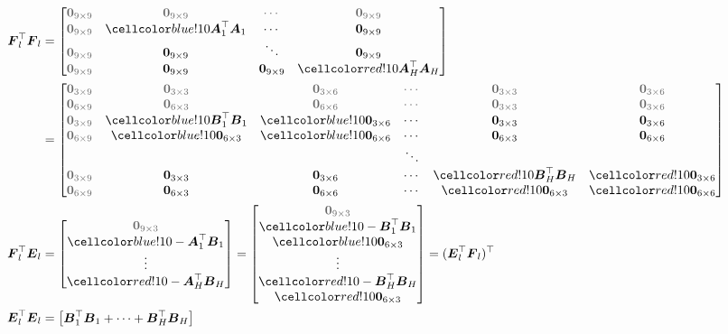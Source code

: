 \begin{align*}
\F_l^\top\F_l &=
\begin{bmatrix}
\g\zero_{9\times9}&\g\zero_{9\times9}&\g\cdots&\g\zero_{9\times9}\\
\g\zero_{9\times9}&\cob\A_1^\top\A_1&\cdots&\zero_{9\times9}\\
\g\zero_{9\times9}&\zero_{9\times9}&\ddots&\zero_{9\times9}\\
\g\zero_{9\times9}&\zero_{9\times9}&\zero_{9\times9}&\cor\A_H^\top\A_H\\
\end{bmatrix}\\
&=
\begin{bmatrix}
\g\zero_{3\times9}&\g\zero_{3\times3}&\g\zero_{3\times6}&\g\cdots&\g\zero_{3\times3}&\g\zero_{3\times6}\\
\g\zero_{6\times9}&\g\zero_{6\times3}&\g\zero_{6\times6}&\g\cdots&\g\zero_{3\times3}&\g\zero_{3\times6}\\
\g\zero_{3\times9}& \cob\B_1^\top\B_1   &\cob\zero_{3\times6} &\cdots   &\zero_{3\times3}&\zero_{3\times6}\\
\g\zero_{6\times9}& \cob\zero_{6\times3}&\cob\zero_{6\times6} &\cdots&\zero_{6\times3}&\zero_{6\times6}\\
&&&\ddots&&\\
\g\zero_{3\times9}&\zero_{3\times3}&\zero_{3\times6}&\cdots&\cor\B_H^\top\B_H   &\cor\zero_{3\times6}\\
\g\zero_{6\times9}&\zero_{6\times3}&\zero_{6\times6}&\cdots&\cor\zero_{6\times3}&\cor\zero_{6\times6}
\end{bmatrix}\\
\F_l^\top\E_l &= \begin{bmatrix} \g\zero_{9\times3}\\ \cob-\A_1^\top\B_1\\ \vdots\\ \cor-\A_H^\top\B_H\\ \end{bmatrix}
=
\begin{bmatrix} \g\zero_{9\times3}\\ \cob-\B_1^\top\B_1\\ \cob\zero_{6\times3}\\ \vdots\\ \cor-\B_H^\top\B_H\\ \cor\zero_{6\times3} \end{bmatrix}
= (\E_l^\top\F_l)^\top\\
\E_l^\top\E_l &=
\begin{bmatrix}
\B_1^\top\B_1 + \cdots + \B_H^\top\B_H
\end{bmatrix}
\end{align*}

